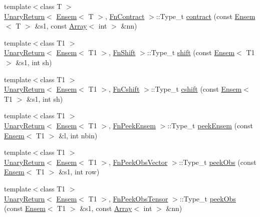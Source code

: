 \begin{DoxyCompactItemize}
{\footnotesize template$<$class T $>$ }\\\mbox{\hyperlink{structENSEM_1_1UnaryReturn}{Unary\+Return}}$<$ \mbox{\hyperlink{classENSEM_1_1Ensem}{Ensem}}$<$ T $>$, \mbox{\hyperlink{structENSEM_1_1FnContract}{Fn\+Contract}} $>$\+::Type\+\_\+t \mbox{\hyperlink{group__eensem_ga1ad11b55c96293cf6f5e776c6c9d0f1b}{contract}} (const \mbox{\hyperlink{classENSEM_1_1Ensem}{Ensem}}$<$ T $>$ \&s1, const \mbox{\hyperlink{classXMLArray_1_1Array}{Array}}$<$ int $>$ \&nn)
\item 
{\footnotesize template$<$class T1 $>$ }\\\mbox{\hyperlink{structENSEM_1_1UnaryReturn}{Unary\+Return}}$<$ \mbox{\hyperlink{classENSEM_1_1Ensem}{Ensem}}$<$ T1 $>$, \mbox{\hyperlink{structENSEM_1_1FnShift}{Fn\+Shift}} $>$\+::Type\+\_\+t \mbox{\hyperlink{group__eensem_gab3a27539680d018ea7af80f7fe677576}{shift}} (const \mbox{\hyperlink{classENSEM_1_1Ensem}{Ensem}}$<$ T1 $>$ \&s1, int sh)
\item 
{\footnotesize template$<$class T1 $>$ }\\\mbox{\hyperlink{structENSEM_1_1UnaryReturn}{Unary\+Return}}$<$ \mbox{\hyperlink{classENSEM_1_1Ensem}{Ensem}}$<$ T1 $>$, \mbox{\hyperlink{structENSEM_1_1FnCshift}{Fn\+Cshift}} $>$\+::Type\+\_\+t \mbox{\hyperlink{group__eensem_gaaf138ac5ffa49ae31d5a073a994dc4c3}{cshift}} (const \mbox{\hyperlink{classENSEM_1_1Ensem}{Ensem}}$<$ T1 $>$ \&s1, int sh)
\item 
{\footnotesize template$<$class T1 $>$ }\\\mbox{\hyperlink{structENSEM_1_1UnaryReturn}{Unary\+Return}}$<$ \mbox{\hyperlink{classENSEM_1_1Ensem}{Ensem}}$<$ T1 $>$, \mbox{\hyperlink{structENSEM_1_1FnPeekEnsem}{Fn\+Peek\+Ensem}} $>$\+::Type\+\_\+t \mbox{\hyperlink{group__eensem_gafcbe1a7f74ec79a0842cfa9aa2ee948c}{peek\+Ensem}} (const \mbox{\hyperlink{classENSEM_1_1Ensem}{Ensem}}$<$ T1 $>$ \&l, int nbin)
\item 
{\footnotesize template$<$class T1 $>$ }\\\mbox{\hyperlink{structENSEM_1_1UnaryReturn}{Unary\+Return}}$<$ \mbox{\hyperlink{classENSEM_1_1Ensem}{Ensem}}$<$ T1 $>$, \mbox{\hyperlink{structENSEM_1_1FnPeekObsVector}{Fn\+Peek\+Obs\+Vector}} $>$\+::Type\+\_\+t \mbox{\hyperlink{group__eensem_gab81975329321ddb7926b2822e0c53a8e}{peek\+Obs}} (const \mbox{\hyperlink{classENSEM_1_1Ensem}{Ensem}}$<$ T1 $>$ \&s1, int row)
\item 
{\footnotesize template$<$class T1 $>$ }\\\mbox{\hyperlink{structENSEM_1_1UnaryReturn}{Unary\+Return}}$<$ \mbox{\hyperlink{classENSEM_1_1Ensem}{Ensem}}$<$ T1 $>$, \mbox{\hyperlink{structENSEM_1_1FnPeekObsTensor}{Fn\+Peek\+Obs\+Tensor}} $>$\+::Type\+\_\+t \mbox{\hyperlink{group__eensem_gadb8dd6729310042f809bf94db594bc5b}{peek\+Obs}} (const \mbox{\hyperlink{classENSEM_1_1Ensem}{Ensem}}$<$ T1 $>$ \&s1, const \mbox{\hyperlink{classXMLArray_1_1Array}{Array}}$<$ int $>$ \&nn)

\end{DoxyCompactItemize}
